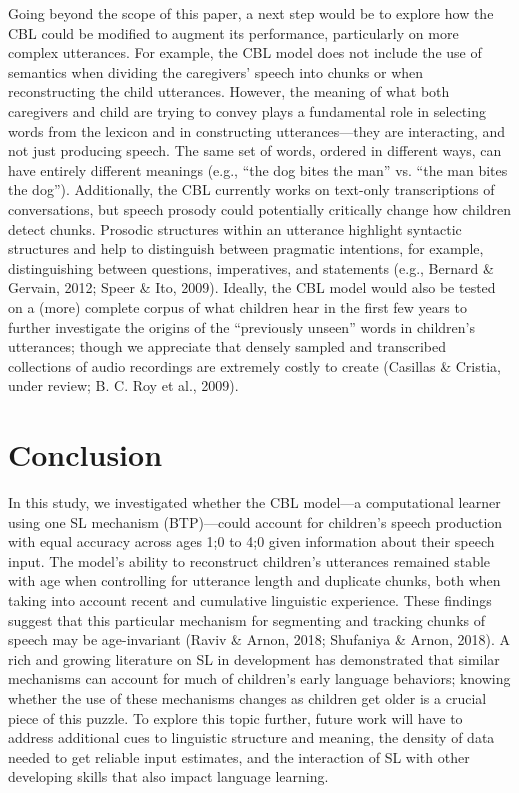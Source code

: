 \documentclass[man,mask,floatsintext]{apa6}
\theoremstyle{definition}
\theoremstyle{definition}
\theoremstyle{definition}
\theoremstyle{remark}
\begin{document}
Going beyond the scope of this paper, a next step would be to explore
how the CBL could be modified to augment its performance, particularly
on more complex utterances. For example, the CBL model does not include
the use of semantics when dividing the caregivers' speech into chunks or
when reconstructing the child utterances. However, the meaning of what
both caregivers and child are trying to convey plays a fundamental role
in selecting words from the lexicon and in constructing
utterances---they are interacting, and not just producing speech. The
same set of words, ordered in different ways, can have entirely
different meanings (e.g., \enquote{the dog bites the man} vs.
\enquote{the man bites the dog}). Additionally, the CBL currently works
on text-only transcriptions of conversations, but speech prosody could
potentially critically change how children detect chunks. Prosodic
structures within an utterance highlight syntactic structures and help
to distinguish between pragmatic intentions, for example, distinguishing
between questions, imperatives, and statements (e.g., Bernard \&
Gervain, 2012; Speer \& Ito, 2009). Ideally, the CBL model would also be
tested on a (more) complete corpus of what children hear in the first
few years to further investigate the origins of the \enquote{previously
unseen} words in children's utterances; though we appreciate that
densely sampled and transcribed collections of audio recordings are
extremely costly to create (Casillas \& Cristia, under review; B. C. Roy
et al., 2009).

\section{Conclusion}\label{conclusion}

In this study, we investigated whether the CBL model---a computational
learner using one SL mechanism (BTP)---could account for children's
speech production with equal accuracy across ages 1;0 to 4;0 given
information about their speech input. The model's ability to reconstruct
children's utterances remained stable with age when controlling for
utterance length and duplicate chunks, both when taking into account
recent and cumulative linguistic experience. These findings suggest that
this particular mechanism for segmenting and tracking chunks of speech
may be age-invariant (Raviv \& Arnon, 2018; Shufaniya \& Arnon, 2018). A
rich and growing literature on SL in development has demonstrated that
similar mechanisms can account for much of children's early language
behaviors; knowing whether the use of these mechanisms changes as
children get older is a crucial piece of this puzzle. To explore this
topic further, future work will have to address additional cues to
linguistic structure and meaning, the density of data needed to get
reliable input estimates, and the interaction of SL with other
developing skills that also impact language learning.
\end{document}

